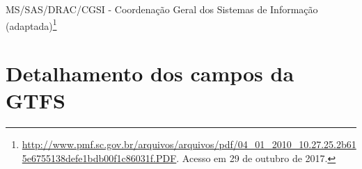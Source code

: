 \documentclass[
	12pt,				%
	oneside,			%
	a4paper,			%
	english,			%
	brazil				%
	]{abntex2ppgsi}
\begin{document}
{{{\begin{apendicesenv}
\begin{longtable}{c|c}
\end{longtable}

 MS/SAS/DRAC/CGSI - Coordenação Geral dos Sistemas de Informação (adaptada)\footnote{\url{http://www.pmf.sc.gov.br/arquivos/arquivos/pdf/04_01_2010_10.27.25.2b615e6755138defe1bdb00f1c86031f.PDF}. Acesso em 29 de outubro de 2017.}

\clearpage


%
%
%
\chapter{Detalhamento dos campos da GTFS}
\label{apendiceC}




\end{apendicesenv}}}}
\end{document}
